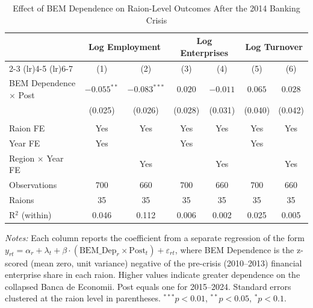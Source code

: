 \begin{table}[htbp]
\centering
\begin{threeparttable}
\caption{Effect of BEM Dependence on Raion-Level Outcomes After the 2014 Banking Crisis}
\label{tab:main}
\begin{tabular}{lcccccc}
\hline\hline
 & \multicolumn{2}{c}{Log Employment} & \multicolumn{2}{c}{Log Enterprises} & \multicolumn{2}{c}{Log Turnover} \\
\cmidrule(lr){2-3} \cmidrule(lr){4-5} \cmidrule(lr){6-7}
 & (1) & (2) & (3) & (4) & (5) & (6) \\
\hline
BEM Dependence $\times$ Post & $-0.055^{**}$ & $-0.083^{***}$ & $0.020$ & $-0.011$ & $0.065$ & $0.028$ \\
 & (0.025) & (0.026) & (0.028) & (0.031) & (0.040) & (0.042) \\
 & & & & & & \\
Raion FE & Yes & Yes & Yes & Yes & Yes & Yes \\
Year FE & Yes & & Yes & & Yes & \\
Region $\times$ Year FE & & Yes & & Yes & & Yes \\
\hline
Observations & 700 & 660 & 700 & 660 & 700 & 660 \\
Raions & 35 & 35 & 35 & 35 & 35 & 35 \\
R$^2$ (within) & 0.046 & 0.112 & 0.006 & 0.002 & 0.025 & 0.005 \\
\hline\hline
\end{tabular}
\begin{tablenotes}[flushleft]\small
\item \textit{Notes:} Each column reports the coefficient from a separate regression of the form $y_{rt} = \alpha_r + \lambda_t + \beta \cdot (\text{BEM\_Dep}_r \times \text{Post}_t) + \varepsilon_{rt}$, where BEM Dependence is the z-scored (mean zero, unit variance) negative of the pre-crisis (2010--2013) financial enterprise share in each raion. Higher values indicate greater dependence on the collapsed Banca de Economii. Post equals one for 2015--2024. Standard errors clustered at the raion level in parentheses. $^{***}p<0.01$, $^{**}p<0.05$, $^{*}p<0.1$.
\end{tablenotes}
\end{threeparttable}
\end{table}

